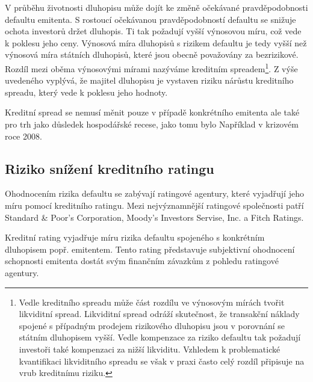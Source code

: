 \documentclass[a4paper]{book}
\begin{document}
V průběhu životnosti dluhopisu může dojít ke změně očekávané pravděpodobnosti defaultu emitenta. S rostoucí očekávanou pravděpodobností defaultu se snižuje ochota investorů držet dluhopis. Ti tak požadují vyšší výnosovou míru, což vede k poklesu jeho ceny. Výnosová míra dluhopisů s rizikem defaultu je tedy vyšší než výnosová míra státních dluhopisů, které jsou obecně považovány za bezrizikové. Rozdíl mezi oběma výnosovými mírami nazýváme kreditním spreadem\footnote{Vedle kreditního spreadu může část rozdílu ve výnosovým mírách tvořit likviditní spread. Likviditní spread odráží skutečnost, že transakční náklady spojené s případným prodejem rizikového dluhopisu jsou v porovnání se státním dluhopisem vyšší. Vedle kompenzace za riziko defaultu tak požadují investoři také kompenzaci za nižší likviditu. Vzhledem k problematické kvantifikaci likviditního spreadu se však v praxi často celý rozdíl připisuje na vrub kreditnímu riziku.}. Z výše uvedeného vyplývá, že majitel dluhopisu je vystaven riziku nárůstu kreditního spreadu, který vede k poklesu jeho hodnoty.

Kreditní spread se nemusí měnit pouze v případě konkrétního emitenta ale také pro trh jako důsledek hospodářské recese, jako tomu bylo Například v krizovém roce 2008.

\subsection{Riziko snížení kreditního ratingu}

Ohodnocením rizika defaultu se zabývají ratingové agentury, které vyjadřují jeho míru pomocí kreditního ratingu. Mezi nejvýznamnější ratingové společnosti patří Standard \& Poor's Corporation, Moody's Investors Servise, Inc. a Fitch Ratings.

Kreditní rating vyjadřuje míru rizika defaultu spojeného s konkrétním dluhopisem popř. emitentem. Tento rating představuje subjektivní ohodnocení schopnosti emitenta dostát svým finančním závazkům z pohledu ratingové agentury.
\end{document}
